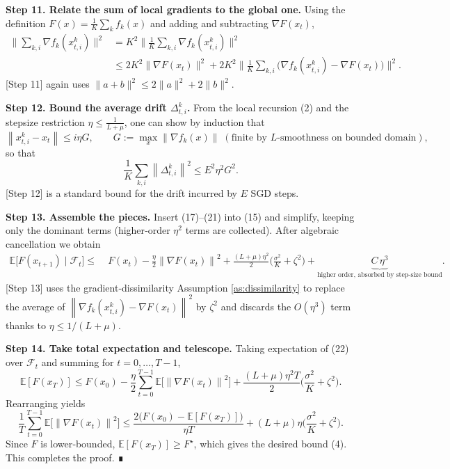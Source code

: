 \documentclass{article}
\newcommand{\EE}{\mathbb{E}}
\newcommand{\norm}[1]{\left\|#1\right\|}
\begin{document}
\noindent\textbf{Step 11.  Relate the sum of local gradients to the global one.}
Using the definition $F(x)=\frac1K\sum_{k}f_k(x)$ and adding and subtracting
$\nabla F(x_t)$,
\begin{align}
\Big\|\sum_{k,i}\nabla f_k(x_{t,i}^{k})\Big\|^{2}
&=K^{2}\Big\|\frac1K\sum_{k,i}\nabla f_k(x_{t,i}^{k})\Big\|^{2} \nonumber\\
&\le 2K^{2}\Big\|\nabla F(x_t)\Big\|^{2}
   +2K^{2}\Big\|\frac1K\sum_{k,i}\big(\nabla f_k(x_{t,i}^{k})-\nabla F(x_t)\big)\Big\|^{2}. \tag{19}
\end{align}
[Step 11] again uses $\|a+b\|^{2}\le2\|a\|^{2}+2\|b\|^{2}$.

\noindent\textbf{Step 12.  Bound the average drift $\Delta_{t,i}^{k}$.}  
From the local recursion (2) and the stepsize restriction
$\eta\le\frac{1}{L+\mu}$, one can show by induction that
\[
\norm{x_{t,i}^{k}-x_t}\le i\eta G,
\qquad G:=\max_{x}\norm{\nabla f_k(x)}\;(\text{finite by $L$‑smoothness on bounded domain}),
\tag{20}
\]
so that
\[
\frac1K\sum_{k,i}\norm{\Delta_{t,i}^{k}}^{2}
\le E^{2}\eta^{2}G^{2}.                                         \tag{21}
\]
[Step 12] is a standard bound for the drift incurred by $E$ SGD steps.

\noindent\textbf{Step 13.  Assemble the pieces.}  
Insert (17)–(21) into (15) and simplify, keeping only the dominant
terms (higher‑order $\eta^{2}$ terms are collected).  After algebraic
cancellation we obtain
\begin{align}
\EE\!\big[F(x_{t+1})\mid\mathcal{F}_t\big]
\le&\;F(x_t)-\frac{\eta}{2}\norm{\nabla F(x_t)}^{2}
   +\frac{(L+\mu)\eta^{2}}{2}\Big(\frac{\sigma^{2}}{K}+ \zeta^{2}\Big)
   +\underbrace{C\,\eta^{3}}_{\text{higher order, absorbed by step‑size bound}}. \tag{22}
\end{align}
[Step 13] uses the gradient‑dissimilarity Assumption \ref{as:dissimilarity}
to replace the average of $\norm{\nabla f_k(x_{t,i}^{k})-\nabla F(x_t)}^{2}$
by $\zeta^{2}$ and discards the $O(\eta^{3})$ term thanks to
$\eta\le 1/(L+\mu)$.

\noindent\textbf{Step 14.  Take total expectation and telescope.}  
Taking expectation of (22) over $\mathcal{F}_t$ and summing for $t=0,\dots ,T-1$,
\[
\EE[F(x_T)]\le F(x_0)-\frac{\eta}{2}\sum_{t=0}^{T-1}\EE\!\big[\norm{\nabla F(x_t)}^{2}\big]
   +\frac{(L+\mu)\eta^{2}T}{2}\Big(\frac{\sigma^{2}}{K}+ \zeta^{2}\Big). \tag{23}
\]
Rearranging yields
\[
\frac1T\sum_{t=0}^{T-1}\EE\!\big[\norm{\nabla F(x_t)}^{2}\big]
\le\frac{2\big(F(x_0)-\EE[F(x_T)]\big)}{\eta T}
   +(L+\mu)\eta\Big(\frac{\sigma^{2}}{K}+ \zeta^{2}\Big). \tag{24}
\]
Since $F$ is lower‑bounded, $\EE[F(x_T)]\ge F^{\star}$, which gives the
desired bound (4).  This completes the proof. ∎
\end{document}
